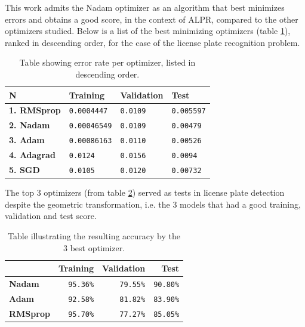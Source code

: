 \documentclass[lnbip]{svmultln}
\begin{document}
	This work admits the Nadam optimizer as an algorithm that best minimizes errors and obtains a good score, in the context of ALPR, compared to the other optimizers studied. Below is a list of the best minimizing optimizers (table \ref{tab:error_rank}), ranked in descending order, for the case of the license plate recognition problem.
	
	
	
		\begin{table}[H]
			\centering
			\begin{tabular}{|l|p{3cm}|p{3cm}|p{3cm}|}
				\hline
				\textbf{N\textdegree} & \textbf{Training} & \textbf{Validation} & \textbf{Test} \\
				\hline
				
				\textbf{1. RMSprop} &
				\texttt{0.0004447} &
				\texttt{0.0109} &
				\texttt{0.005597} \\
				\hline
				
				\textbf{2. Nadam} &
				\texttt{0.00046549} &
				\texttt{0.0109} &
				\texttt{0.00479} \\
				\hline
				
				\textbf{3. Adam} &
				\texttt{0.00086163} &
				\texttt{0.0110} &
				\texttt{0.00526} \\
				\hline
				
				\textbf{4. Adagrad} &
				\texttt{0.0124} &
				\texttt{0.0156} &
				\texttt{0.0094} \\
				\hline
				
				\textbf{5. SGD} &
				\texttt{0.0105} &
				\texttt{0.0120} &
				\texttt{0.00732} \\
				\hline
			\end{tabular} 
		\caption{Table showing error rate per optimizer, listed in descending order. }
		\label{tab:error_rank}
		\end{table}
	
		
		The top 3 optimizers (from table \ref{tab:accuracy_rank}) served as tests in license plate detection despite the geometric transformation, i.e. the 3 models that had a good training, validation and test score.
		\begin{table}[H]
			\centering
			\begin{tabular}{l|r|r|r}
				\hline
				& \textbf{Training} & \textbf{Validation} & \textbf{Test} \\
				
				\hline
				\textbf{Nadam} &
				\texttt{95.36\%} &
				\texttt{79.55\%} &
				\texttt{90.80\%} \\
				\hline
				\textbf{Adam} &
				\texttt{92.58\%} &
				\texttt{81.82\%} &
				\texttt{83.90\%} \\
				\hline
				\textbf{RMSprop} &
				\texttt{95.70\%} &
				\texttt{77.27\%} &
				\texttt{85.05\%} \\
				\hline
				
			\end{tabular}
		\caption{Table illustrating the resulting accuracy by the 3 best optimizer.} 
		\label{tab:accuracy_rank}
		\end{table}
	
\end{document}
